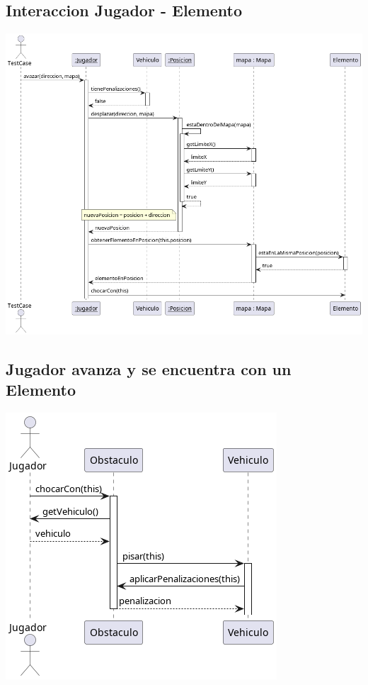 \documentclass[titlepage,a4paper]{article}
\begin{document}
\subsection{Interaccion Jugador - Elemento}
\label{sec:orgeeb41fa}

\begin{center}
\includegraphics[width=.9\linewidth]{./diagramas/jugadorAvanzaYSeEncuentraConUnElemento.png}
\end{center}

\subsection{Jugador avanza y se encuentra con un Elemento}
\label{sec:org02f14f5}

\begin{center}
\includegraphics[width=.9\linewidth]{./diagramas/jugadorAvanzaYSeEncuentraConUnObstaculo.png}
\end{center}
\end{document}
